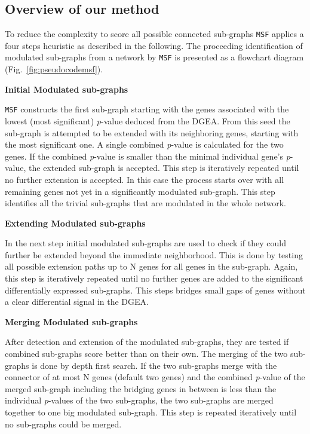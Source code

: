 \documentclass[10pt,a4paper,twocolumn]{article}
\begin{document}
\subsection*{Overview of our method}

To reduce the complexity to score all possible connected sub-graphs
\texttt{MSF} applies a four steps heuristic as described in the
following. The proceeding identification of modulated sub-graphs from
a network by \texttt{MSF} is presented as a flowchart diagram
(Fig.~\ref{fig:pseudocodemsf}).



\textbf{Initial Modulated sub-graphs}

\texttt{MSF} constructs the first sub-graph starting with the genes
associated with the lowest (most significant) \textit{p}-value deduced
from the DGEA. From this seed the sub-graph is attempted to be
extended with its neighboring genes, starting with the most
significant one. A single combined \textit{p}-value is calculated for
the two genes. If the combined \textit{p}-value is smaller than the
minimal individual gene's \textit{p}-value, the extended sub-graph is
accepted. This step is iteratively repeated until no further extension
is accepted. In this case the process starts over with all remaining
genes not yet in a significantly modulated sub-graph. This step
identifies all the trivial sub-graphs that are modulated in the whole
network.\newline

\textbf{Extending Modulated sub-graphs}

In the next step initial modulated sub-graphs are used to check if
they could further be extended beyond the immediate neighborhood. This
is done by testing all possible extension paths up to N genes for all
genes in the sub-graph. Again, this step is iteratively repeated until
no further genes are added to the significant differentially expressed
sub-graphs. This steps bridges small gaps of genes without a clear
differential signal in the DGEA.\newline

\textbf{Merging Modulated sub-graphs}

After detection and extension of the modulated sub-graphs, they are tested
if combined sub-graphs score better than on their own. The merging of the
two sub-graphs is done by depth first search. If the two sub-graphs merge
with the connector of at most N genes (default two genes) and the combined
\textit{p}-value of the merged sub-graph including the bridging genes in
between is less than the individual \textit{p}-values of the two
sub-graphs, the two sub-graphs are merged together to one big modulated
sub-graph. This step is repeated iteratively until no sub-graphs could be
merged.\newline
\end{document}
